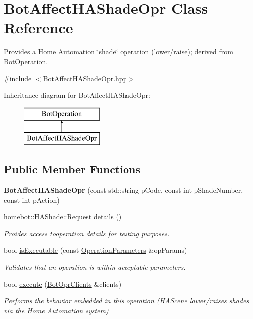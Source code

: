 \hypertarget{classBotAffectHAShadeOpr}{\section{Bot\-Affect\-H\-A\-Shade\-Opr Class Reference}
\label{classBotAffectHAShadeOpr}
}


Provides a Home Automation \char`\"{}shade\char`\"{} operation (lower/raise); derived from \hyperlink{classBotOperation}{Bot\-Operation}.  




{\ttfamily \#include $<$Bot\-Affect\-H\-A\-Shade\-Opr.\-hpp$>$}

Inheritance diagram for Bot\-Affect\-H\-A\-Shade\-Opr\-:\begin{figure}[H]
\begin{center}
\leavevmode
\includegraphics[height=2.000000cm]{classBotAffectHAShadeOpr}
\end{center}
\end{figure}
\subsection*{Public Member Functions}
\begin{DoxyCompactItemize}
\item 
\hypertarget{classBotAffectHAShadeOpr_a84f68ccbc995adb8bcb8bb06c2c615ee}{{\bfseries Bot\-Affect\-H\-A\-Shade\-Opr} (const std\-::string p\-Code, const int p\-Shade\-Number, const int p\-Action)}\label{classBotAffectHAShadeOpr_a84f68ccbc995adb8bcb8bb06c2c615ee}

\item 
homebot\-::\-H\-A\-Shade\-::\-Request \hyperlink{classBotAffectHAShadeOpr_a45e3809806091e342492d66e8fade1a6}{details} ()
\begin{DoxyCompactList}\small\item\em Proides access tooperation details for testing purposes. \end{DoxyCompactList}\item 
bool \hyperlink{classBotAffectHAShadeOpr_af37862e410311c38fd41994c51138cf6}{is\-Executable} (const \hyperlink{classOperationParameters}{Operation\-Parameters} \&op\-Params)
\begin{DoxyCompactList}\small\item\em Validates that an operation is within acceptable parameters. \end{DoxyCompactList}\item 
bool \hyperlink{classBotAffectHAShadeOpr_aab37d71a095f66554ee9958057c71356}{execute} (\hyperlink{classBotOprClients}{Bot\-Opr\-Clients} \&clients)
\begin{DoxyCompactList}\small\item\em Performs the behavior embedded in this operation (H\-A\-Scene lower/raises shades via the Home Automation system) \end{DoxyCompactList}\end{DoxyCompactItemize}
